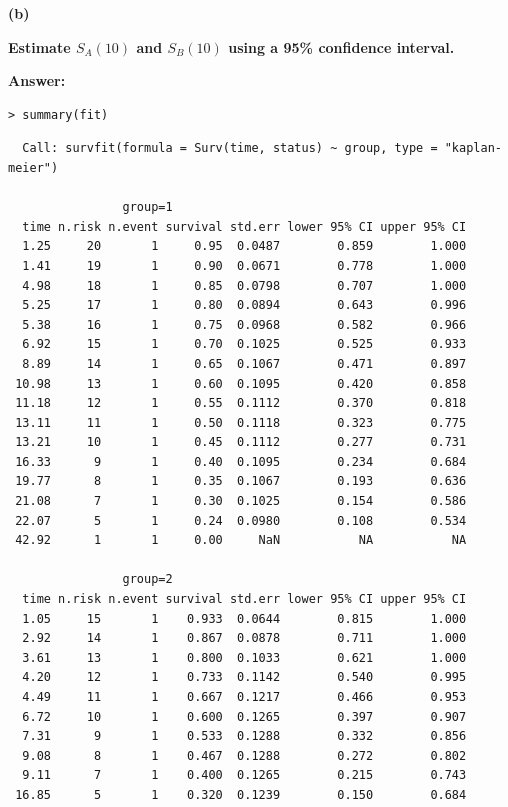 \documentclass[letterpaper,11pt]{article}
\begin{document}
\begin{addmargin}[-1.1em]{0em}
  \textbf{(b)}\par
\end{addmargin}
\textbf{Estimate $S_A(10)$ and $S_B(10)$ using a 95\% confidence interval.}\par
\bigbreak
\begin{addmargin}[-0.5em]{0em}
  \textbf{Answer: }
\end{addmargin}


\begin{lstlisting}
> summary(fit)
\end{lstlisting}

\begin{lstlisting}
  Call: survfit(formula = Surv(time, status) ~ group, type = "kaplan-meier")

                group=1
  time n.risk n.event survival std.err lower 95% CI upper 95% CI
  1.25     20       1     0.95  0.0487        0.859        1.000
  1.41     19       1     0.90  0.0671        0.778        1.000
  4.98     18       1     0.85  0.0798        0.707        1.000
  5.25     17       1     0.80  0.0894        0.643        0.996
  5.38     16       1     0.75  0.0968        0.582        0.966
  6.92     15       1     0.70  0.1025        0.525        0.933
  8.89     14       1     0.65  0.1067        0.471        0.897
 10.98     13       1     0.60  0.1095        0.420        0.858
 11.18     12       1     0.55  0.1112        0.370        0.818
 13.11     11       1     0.50  0.1118        0.323        0.775
 13.21     10       1     0.45  0.1112        0.277        0.731
 16.33      9       1     0.40  0.1095        0.234        0.684
 19.77      8       1     0.35  0.1067        0.193        0.636
 21.08      7       1     0.30  0.1025        0.154        0.586
 22.07      5       1     0.24  0.0980        0.108        0.534
 42.92      1       1     0.00     NaN           NA           NA

                group=2
  time n.risk n.event survival std.err lower 95% CI upper 95% CI
  1.05     15       1    0.933  0.0644        0.815        1.000
  2.92     14       1    0.867  0.0878        0.711        1.000
  3.61     13       1    0.800  0.1033        0.621        1.000
  4.20     12       1    0.733  0.1142        0.540        0.995
  4.49     11       1    0.667  0.1217        0.466        0.953
  6.72     10       1    0.600  0.1265        0.397        0.907
  7.31      9       1    0.533  0.1288        0.332        0.856
  9.08      8       1    0.467  0.1288        0.272        0.802
  9.11      7       1    0.400  0.1265        0.215        0.743
 16.85      5       1    0.320  0.1239        0.150        0.684
\end{lstlisting}
\end{document}
